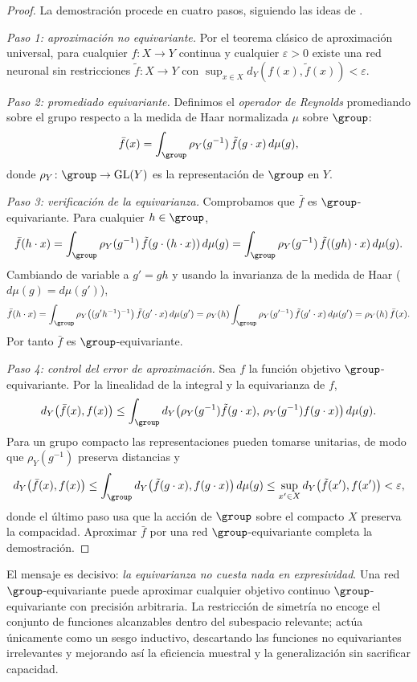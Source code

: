 \begin{proof}
La demostraci\'on procede en cuatro pasos, siguiendo las ideas de
\citet{yarotsky2022}.

\emph{Paso 1: aproximaci\'on no equivariante.} Por el teorema cl\'asico de
aproximaci\'on universal, para cualquier $f \colon X \to Y$ continua y cualquier
$\varepsilon > 0$ existe una red neuronal sin restricciones
$\tilde f \colon X \to Y$ con
$\sup_{x \in X} d_Y(f(x), \tilde f(x)) < \varepsilon$.

\emph{Paso 2: promediado equivariante.} Definimos el \emph{operador de Reynolds}
promediando sobre el grupo respecto a la medida de Haar normalizada $\mu$ sobre
$\group$:
\[
  \bar f(x) = \int_{\group} \rho_Y(g^{-1})\, \tilde f(g \cdot x)\, d\mu(g),
\]
donde $\rho_Y \colon \group \to \GL(Y)$ es la representaci\'on de $\group$ en $Y$.

\emph{Paso 3: verificaci\'on de la equivarianza.} Comprobamos que $\bar f$ es
$\group$-equivariante. Para cualquier $h \in \group$,
\[
  \bar f(h \cdot x)
    = \int_{\group} \rho_Y(g^{-1})\, \tilde f(g \cdot (h \cdot x))\, d\mu(g)
    = \int_{\group} \rho_Y(g^{-1})\, \tilde f((gh) \cdot x)\, d\mu(g).
\]
Cambiando de variable a $g' = gh$ y usando la invarianza de la medida de Haar
($d\mu(g) = d\mu(g')$),
\[
  \bar f(h \cdot x)
    = \int_{\group} \rho_Y\bigl((g'h^{-1})^{-1}\bigr)\, \tilde f(g' \cdot x)\, d\mu(g')
    = \rho_Y(h) \int_{\group} \rho_Y(g'^{-1})\, \tilde f(g' \cdot x)\, d\mu(g')
    = \rho_Y(h)\, \bar f(x).
\]
Por tanto $\bar f$ es $\group$-equivariante.

\emph{Paso 4: control del error de aproximaci\'on.} Sea $f$ la funci\'on objetivo
$\group$-equivariante. Por la linealidad de la integral y la equivarianza de $f$,
\[
  d_Y\bigl(\bar f(x), f(x)\bigr)
    \le \int_{\group} d_Y\bigl(\rho_Y(g^{-1}) \tilde f(g \cdot x),\,
        \rho_Y(g^{-1}) f(g \cdot x)\bigr)\, d\mu(g).
\]
Para un grupo compacto las representaciones pueden tomarse unitarias, de modo que
$\rho_Y(g^{-1})$ preserva distancias y
\[
  d_Y\bigl(\bar f(x), f(x)\bigr)
    \le \int_{\group} d_Y\bigl(\tilde f(g \cdot x), f(g \cdot x)\bigr)\, d\mu(g)
    \le \sup_{x' \in X} d_Y\bigl(\tilde f(x'), f(x')\bigr) < \varepsilon,
\]
donde el \'ultimo paso usa que la acci\'on de $\group$ sobre el compacto $X$
preserva la compacidad. Aproximar $\bar f$ por una red $\group$-equivariante
completa la demostraci\'on. \qedhere
\end{proof}

El mensaje es decisivo: \emph{la equivarianza no cuesta nada en expresividad}. Una
red $\group$-equivariante puede aproximar cualquier objetivo continuo
$\group$-equivariante con precisi\'on arbitraria. La restricci\'on de simetr\'ia no
encoge el conjunto de funciones alcanzables dentro del subespacio relevante;
act\'ua \'unicamente como un sesgo inductivo, descartando las funciones no
equivariantes irrelevantes y mejorando as\'i la eficiencia muestral y la
generalizaci\'on sin sacrificar capacidad.


